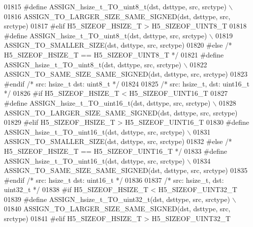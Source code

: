 \begin{DoxyCode}
01815 \textcolor{preprocessor}{    #define ASSIGN\_hsize\_t\_TO\_uint8\_t(dst, dsttype, src, srctype) \(\backslash\)}
01816 \textcolor{preprocessor}{        ASSIGN\_TO\_LARGER\_SIZE\_SAME\_SIGNED(dst, dsttype, src, srctype)}
01817 \textcolor{preprocessor}{#elif H5\_SIZEOF\_HSIZE\_T > H5\_SIZEOF\_UINT8\_T}
01818 \textcolor{preprocessor}{    #define ASSIGN\_hsize\_t\_TO\_uint8\_t(dst, dsttype, src, srctype) \(\backslash\)}
01819 \textcolor{preprocessor}{        ASSIGN\_TO\_SMALLER\_SIZE(dst, dsttype, src, srctype)}
01820 \textcolor{preprocessor}{#else }\textcolor{comment}{/* H5\_SIZEOF\_HSIZE\_T == H5\_SIZEOF\_UINT8\_T */}\textcolor{preprocessor}{}
01821 \textcolor{preprocessor}{    #define ASSIGN\_hsize\_t\_TO\_uint8\_t(dst, dsttype, src, srctype) \(\backslash\)}
01822 \textcolor{preprocessor}{        ASSIGN\_TO\_SAME\_SIZE\_SAME\_SIGNED(dst, dsttype, src, srctype)}
01823 \textcolor{preprocessor}{#endif }\textcolor{comment}{/* src: hsize\_t dst: uint8\_t */}\textcolor{preprocessor}{}
01824 
01825 \textcolor{comment}{/* src: hsize\_t, dst: uint16\_t */}
01826 \textcolor{preprocessor}{#if H5\_SIZEOF\_HSIZE\_T < H5\_SIZEOF\_UINT16\_T}
01827 \textcolor{preprocessor}{    #define ASSIGN\_hsize\_t\_TO\_uint16\_t(dst, dsttype, src, srctype) \(\backslash\)}
01828 \textcolor{preprocessor}{        ASSIGN\_TO\_LARGER\_SIZE\_SAME\_SIGNED(dst, dsttype, src, srctype)}
01829 \textcolor{preprocessor}{#elif H5\_SIZEOF\_HSIZE\_T > H5\_SIZEOF\_UINT16\_T}
01830 \textcolor{preprocessor}{    #define ASSIGN\_hsize\_t\_TO\_uint16\_t(dst, dsttype, src, srctype) \(\backslash\)}
01831 \textcolor{preprocessor}{        ASSIGN\_TO\_SMALLER\_SIZE(dst, dsttype, src, srctype)}
01832 \textcolor{preprocessor}{#else }\textcolor{comment}{/* H5\_SIZEOF\_HSIZE\_T == H5\_SIZEOF\_UINT16\_T */}\textcolor{preprocessor}{}
01833 \textcolor{preprocessor}{    #define ASSIGN\_hsize\_t\_TO\_uint16\_t(dst, dsttype, src, srctype) \(\backslash\)}
01834 \textcolor{preprocessor}{        ASSIGN\_TO\_SAME\_SIZE\_SAME\_SIGNED(dst, dsttype, src, srctype)}
01835 \textcolor{preprocessor}{#endif }\textcolor{comment}{/* src: hsize\_t dst: uint16\_t */}\textcolor{preprocessor}{}
01836 
01837 \textcolor{comment}{/* src: hsize\_t, dst: uint32\_t */}
01838 \textcolor{preprocessor}{#if H5\_SIZEOF\_HSIZE\_T < H5\_SIZEOF\_UINT32\_T}
01839 \textcolor{preprocessor}{    #define ASSIGN\_hsize\_t\_TO\_uint32\_t(dst, dsttype, src, srctype) \(\backslash\)}
01840 \textcolor{preprocessor}{        ASSIGN\_TO\_LARGER\_SIZE\_SAME\_SIGNED(dst, dsttype, src, srctype)}
01841 \textcolor{preprocessor}{#elif H5\_SIZEOF\_HSIZE\_T > H5\_SIZEOF\_UINT32\_T}

\end{DoxyCode}
